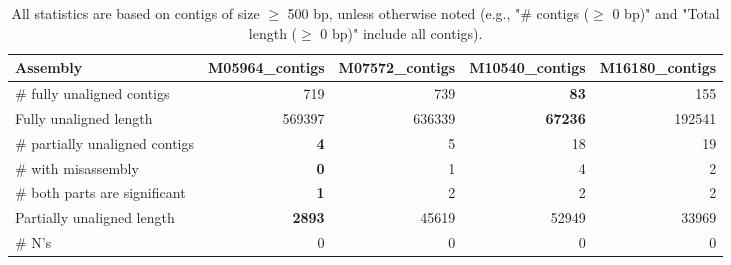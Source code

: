 \documentclass[12pt,a4paper]{article}
\begin{document}
\begin{table}[ht]
\begin{center}
\caption{All statistics are based on contigs of size $\geq$ 500 bp, unless otherwise noted (e.g., "\# contigs ($\geq$ 0 bp)" and "Total length ($\geq$ 0 bp)" include all contigs).}
\begin{tabular}{|l*{4}{|r}|}
\hline
Assembly & M05964\_contigs & M07572\_contigs & M10540\_contigs & M16180\_contigs \\ \hline
\# fully unaligned contigs & 719 & 739 & {\bf 83} & 155 \\ \hline
Fully unaligned length & 569397 & 636339 & {\bf 67236} & 192541 \\ \hline
\# partially unaligned contigs & {\bf 4} & 5 & 18 & 19 \\ \hline
\hspace{5mm}\# with misassembly & {\bf 0} & 1 & 4 & 2 \\ \hline
\hspace{5mm}\# both parts are significant & {\bf 1} & 2 & 2 & 2 \\ \hline
Partially unaligned length & {\bf 2893} & 45619 & 52949 & 33969 \\ \hline
\# N's & 0 & 0 & 0 & 0 \\ \hline
\end{tabular}
\end{center}
\end{table}
\end{document}

